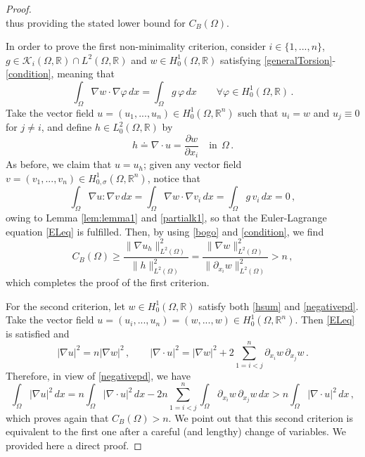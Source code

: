 \documentclass[10pt,a4paper]{amsart}
\begin{document}
\begin{proof}
$$	$$
	thus providing the stated lower bound for $C_B(\Omega)$.\par
	In order to prove the first non-minimality criterion, consider $i \in \{1,...,n\}$, $g\in\mathcal{K}_{i}(\Omega, \mathbb{R}) \cap L^{2}(\Omega, \mathbb{R})$ and $w\in H^1_0(\Omega, \mathbb{R})$  satisfying \eqref{generalTorsion}-\eqref{condition}, meaning that
	\begin{equation}\label{partialk1}
	\int_\Omega \nabla w \cdot \nabla \varphi  \, dx = \int_\Omega g \, \varphi \, dx\qquad \forall \varphi \in H^1_0(\Omega, \mathbb{R}) \, .
	\end{equation}
	Take the vector field
	$u=(u_1,...,u_n)\in H^1_0(\Omega, \mathbb{R}^{n})$ such that $u_i=w$ and $u_j\equiv0$ for $j \neq i$, and define $h \in L_{0}^{2}(\Omega, \mathbb{R})$ by
	$$
	h\doteq\nabla\cdot u=\dfrac{\partial w}{\partial x_{i}} \quad \text{in} \ \ \Omega \, .
	$$
	As before, we claim that $u = u_h$; given any vector field $v = (v_{1},...,v_{n}) \in H^{1}_{0,\sigma}(\Omega, \mathbb{R}^{n})$, notice that
	$$
	\int_{\Omega} \nabla u : \nabla v \, dx= \int_{\Omega} \nabla w \cdot \nabla v_{i} \, dx= \int_{\Omega} g \, v_{i}\, dx = 0 \, ,
	$$
	owing to Lemma \ref{lem:lemma1} and \eqref{partialk1}, so that the Euler-Lagrange equation \eqref{ELeq} is fulfilled.  Then, by using \eqref{bogo} and \eqref{condition}, we find
	$$
	C_B(\Omega)\ge\frac{\|\nabla u_{h}\|_{L^2(\Omega)}^2}{\|h\|_{L^2(\Omega)}^2}=\frac{\|\nabla w\|_{L^2(\Omega)}^2}{\|\partial_{x_i}w\|_{L^2(\Omega)}^2}>n\, ,
	$$
	which completes the proof of the first criterion.\par
For the second criterion, let $w\in H^1_0(\Omega, \mathbb{R})$ satisfy both \eqref{hsum} and \eqref{negativepd}.
Take the vector field $u=(u_i,...,u_n)=(w,...,w)\in H^1_0(\Omega, \mathbb{R}^{n})$. Then \eqref{ELeq} is satisfied and
$$
|\nabla u|^2=n|\nabla w|^2\, ,\qquad|\nabla\cdot u|^2=|\nabla w|^2+2\sum_{1=i<j}^{n}\partial_{x_i}w\, \partial_{x_j}w\, .
$$
Therefore, in view of \eqref{negativepd}, we have
$$
\int_\Omega|\nabla u|^2\, dx=n\int_\Omega|\nabla\cdot u|^2\, dx-2n\sum_{1=i<j}^{n}\int_\Omega\partial_{x_i}w\, \partial_{x_j}w\, dx>n\int_\Omega|\nabla\cdot u|^2\, dx\, ,
$$
which proves again that $C_B(\Omega)>n$. We point out that this second criterion is equivalent to the first one after a careful
(and lengthy) change of variables. We provided here a direct proof.\end{proof}
\end{document}
